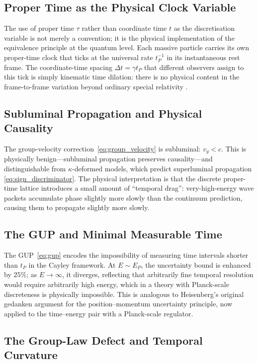 \documentclass[12pt,a4paper]{article}
\begin{document}
\subsection{Proper Time as the Physical Clock Variable}

The use of proper time $\tau$ rather than coordinate time $t$ as the discretisation
variable is not merely a convention; it is the physical implementation of the equivalence
principle at the quantum level.  Each massive particle carries its own proper-time clock
that ticks at the universal rate $t_P^{-1}$ in its instantaneous rest frame.  The
coordinate-time spacing $\Delta t = \gamma t_P$ that different observers assign to this
tick is simply kinematic time dilation: there is no physical content in the frame-to-frame
variation beyond ordinary special relativity \cite{ashtekar2004}.

\subsection{Subluminal Propagation and Physical Causality}

The group-velocity correction~\eqref{eq:group_velocity} is subluminal: $v_g < c$.
This is physically benign---subluminal propagation preserves causality---and
distinguishable from $\kappa$-deformed models, which predict superluminal propagation
\eqref{eq:sign_discriminator}.  The physical interpretation is that the discrete proper-time
lattice introduces a small amount of ``temporal drag'': very-high-energy wave packets
accumulate phase slightly more slowly than the continuum prediction, causing them to
propagate slightly more slowly.

\subsection{The GUP and Minimal Measurable Time}

The GUP~\eqref{eq:gup} encodes the impossibility of measuring time intervals shorter than
$t_P$ in the Cayley framework.  At $E \sim E_P$, the uncertainty bound is enhanced by
$25\%$; as $E \to \infty$, it diverges, reflecting that arbitrarily fine temporal
resolution would require arbitrarily high energy, which in a theory with Planck-scale
discreteness is physically impossible.  This is analogous to Heisenberg's original
gedanken argument for the position--momentum uncertainty principle, now applied to the
time--energy pair with a Planck-scale regulator.

\subsection{The Group-Law Defect and Temporal Curvature}
\end{document}
